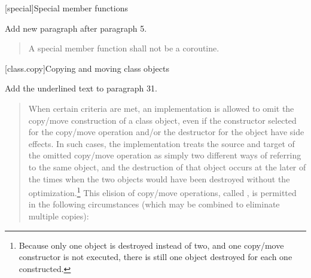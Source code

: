 
\setcounter{chapter}{11}
[special]{Special member functions}

Add new paragraph after paragraph 5.

\begin{quote}
	\setcounter{Paras}{5}
	\pnum
	A special member function shall not be a coroutine.
\end{quote}

\setcounter{section}{7}
[class.copy]{Copying and moving class objects}%


Add the underlined text to paragraph 31.

\begin{quote}
\setcounter{Paras}{30}
\pnum
{}%
%
%
%
%
When certain criteria are met, an implementation is
allowed to omit the copy/move construction of a class object,
even if the constructor selected for the copy/move operation and/or the
destructor for the object have
%
side effects.  In such cases, the
implementation treats the source and target of the
omitted copy/move operation as simply two different ways of
referring to the same object, and the destruction of
that object occurs at the later of the times when the
two objects would have been destroyed without the
optimization.\footnote{Because only one object is destroyed instead of two,
  and one copy/move constructor
  is not executed, there is still one object destroyed for each one constructed.}
This elision of copy/move operations, called
%
%
,
is permitted in the
following circumstances (which may be combined to
eliminate multiple copies):


\end{quote}
